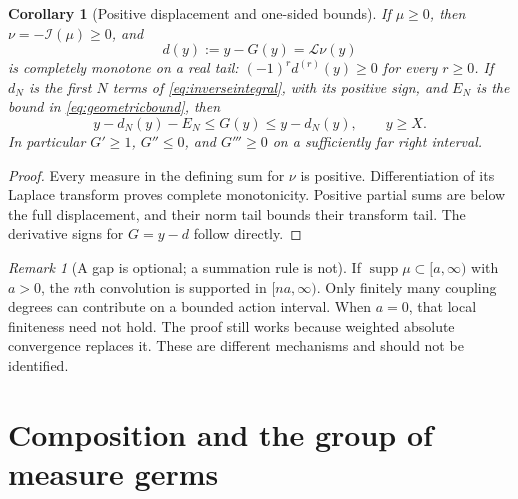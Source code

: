 \documentclass[11pt,a4paper]{article}
\newtheorem{corollary}[theorem]{Corollary}
\theoremstyle{definition}
\theoremstyle{remark}
\newtheorem{remark}[theorem]{Remark}
\newcommand{\Lap}{\mathcal L}
\newcommand{\Inv}{\mathcal I}
\newcommand{\supp}{\operatorname{supp}}
\numberwithin{equation}{section}
\begin{document}
\begin{corollary}[Positive displacement and one-sided bounds]\label{cor:positive}
If $\mu\ge0$, then $\nu=-\Inv(\mu)\ge0$, and
\[
 d(y):=y-G(y)=\Lap\nu(y)
\]
is completely monotone on a real tail: $(-1)^r d^{(r)}(y)\ge0$ for every $r\ge0$. If $d_N$ is the first $N$ terms of \eqref{eq:inverseintegral}, with its positive sign, and $E_N$ is the bound in \eqref{eq:geometricbound}, then
\begin{equation}\label{eq:onesided}
 y-d_N(y)-E_N\le G(y)\le y-d_N(y),\qquad y\ge X.
\end{equation}
In particular $G'\ge1$, $G''\le0$, and $G'''\ge0$ on a sufficiently far right interval.
\end{corollary}
\begin{proof}
Every measure in the defining sum for $\nu$ is positive. Differentiation of its Laplace transform proves complete monotonicity. Positive partial sums are below the full displacement, and their norm tail bounds their transform tail. The derivative signs for $G=y-d$ follow directly.
\end{proof}

\begin{remark}[A gap is optional; a summation rule is not]
If $\supp\mu\subset[a,\infty)$ with $a>0$, the $n$th convolution is supported in $[na,\infty)$. Only finitely many coupling degrees can contribute on a bounded action interval. When $a=0$, that local finiteness need not hold. The proof still works because weighted absolute convergence replaces it. These are different mechanisms and should not be identified.
\end{remark}

\section{Composition and the group of measure germs}\label{sec:group}
\end{document}
